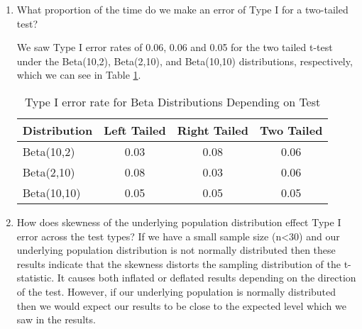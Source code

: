 \documentclass{article}\usepackage[]{graphicx}\usepackage[]{xcolor}
\begin{document}
\begin{enumerate}
\begin{enumerate}
    We saw Type I error rates of 0.08, 0.03 and 0.05 for the right tailed t-test under the Beta(10,2), Beta(2,10), and Beta(10,10) distributions, respectively, which we can see in Table \ref{table1}.
    
    \item What proportion of the time do we make an error of Type I for a
    two-tailed test?
    
    We saw Type I error rates of 0.06, 0.06 and 0.05 for the two tailed t-test under the Beta(10,2), Beta(2,10), and Beta(10,10) distributions, respectively, which we can see in Table \ref{table1}.
    
    
    \begin{table}[ht]
\centering
\begin{tabular}{lccc}
  \hline
Distribution & Left Tailed & Right Tailed & Two Tailed \\ 
  \hline
Beta(10,2) & 0.03 & 0.08 & 0.06 \\ 
  Beta(2,10) & 0.08 & 0.03 & 0.06 \\ 
  Beta(10,10) & 0.05 & 0.05 & 0.05 \\ 
   \hline
\end{tabular}
\caption{Type I error rate for Beta Distributions Depending on Test}
\label{table1}
\end{table}
    \item How does skewness of the underlying population distribution effect
    Type I error across the test types?
  If we have a small sample size (n<30) and our underlying population distribution is not normally distributed then these results indicate that the skewness distorts the sampling distribution of the t-statistic. It causes both inflated or deflated results depending on the direction of the test. However, if our underlying population is normally distributed then we would expect our results to be close to the expected level which we saw in the results. 
    
    
  \end{enumerate}
\end{enumerate}

\end{document}

